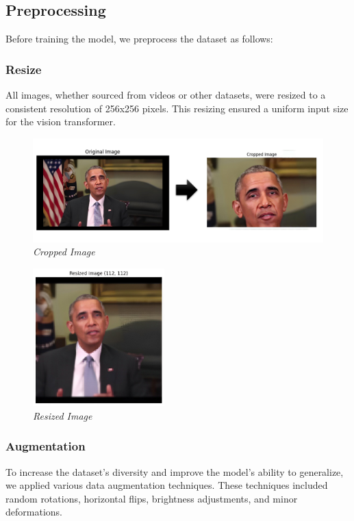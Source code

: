\subsection{Preprocessing}

Before training the model, we preprocess the dataset as follows:

\subsubsection{Resize}
All images, whether sourced from videos or other datasets, were resized to a consistent resolution of 256x256 pixels. This resizing ensured a uniform input size for the vision transformer.

\begin{figure}[ht]
    \centering
    \includegraphics[width=5in]{img/cropped.jpg}
    \caption{\textit{Cropped Image}}
    \label{fig:cropped}
\end{figure}

\begin{figure}[ht]
    \centering
    \includegraphics[width=2in]{img/resized.jpg}
    \caption{\textit{Resized Image}}
    \label{fig:resized}
\end{figure}

\subsubsection{Augmentation} To increase the dataset's diversity and improve the model's ability to generalize, we applied various data augmentation techniques. These techniques included random rotations, horizontal flips, brightness adjustments, and minor deformations.
\newpage
